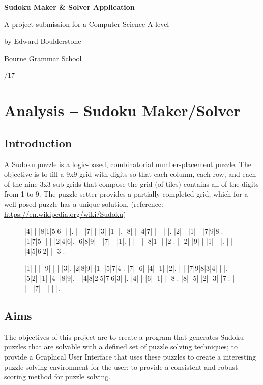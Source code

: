 \documentclass[fleqn]{article}
\newcommand*{\ProjectTitlePage}{
\begingroup
\vspace*{60pt}
\centerline{\fontsize{16pt}{32pt}\selectfont\textbf{Sudoku Maker \& Solver Application}}
\vspace*{60pt}
\centerline{\fontsize{14pt}{24pt}\selectfont A project submission for a Computer Science A level}
\vspace*{60pt}
\centerline{\fontsize{14pt}{16pt}\selectfont by Edward Boulderstone}
\vspace*{60pt}
\centerline{\fontsize{14pt}{20pt}\selectfont Bourne Grammar School}
\vspace*{60pt}
\centerline{\fontsize{14pt}{20pt}\selectfont 2016/17}
\endgroup}
\begin{document}
\ProjectTitlePage
\newpage

\tableofcontents

\newpage
\section{Analysis – Sudoku Maker/Solver}

\subsection{Introduction}

A Sudoku puzzle is a logic-based, combinatorial number-placement puzzle. The objective is to fill a 9x9 grid with digits so that each column, each row, and each of the nine 3x3 sub-grids that compose the grid (of tiles) contains all of the digits from 1 to 9. The puzzle setter provides a partially completed grid, which for a well-posed puzzle has a unique solution. (reference: \url{https://en.wikipedia.org/wiki/Sudoku})


\begin{figure}[!htbp]
\centering
\begin{minipage}{.45\linewidth}
\begin{sudoku}
|4| | |8|1|5|6| | |.
| | |7| | |3| |1| |.
|8| | |4|7| | | | |.
|2| | |1| | |7|9|8|.
|1|7|5| | | |2|4|6|.
|6|8|9| | |7| | |1|.
| | | | |8|1| | |2|.
| |2| |9| | |1| | |.
| | |4|5|6|2| | |3|.
\end{sudoku}
\end{minipage}
\hspace{.05\linewidth}
\begin{minipage}{.45\linewidth}
\begin{sudoku}
|1| | | |9| | | |3|.
|2|8|9| |1| |5|7|4|.
|7| |6| |4| |1| |2|.
| | |7|9|8|3|4| | |.
|5|2| |1| |4| |8|9|.
| |4|8|2|5|7|6|3| |.
|4| | |6| |1| | |8|.
|8| |5| |2| |3| |7|.
| | | | |7| | | | |.
\end{sudoku}
\end{minipage}
\end{figure}


\subsection{Aims}
The objectives of this project are to create a program that generates Sudoku puzzles that are solvable with a defined set of puzzle solving techniques; to provide a Graphical User Interface that uses these puzzles to create a interesting puzzle solving environment for the user; to provide a consistent and robust scoring method for puzzle solving.
\end{document}
